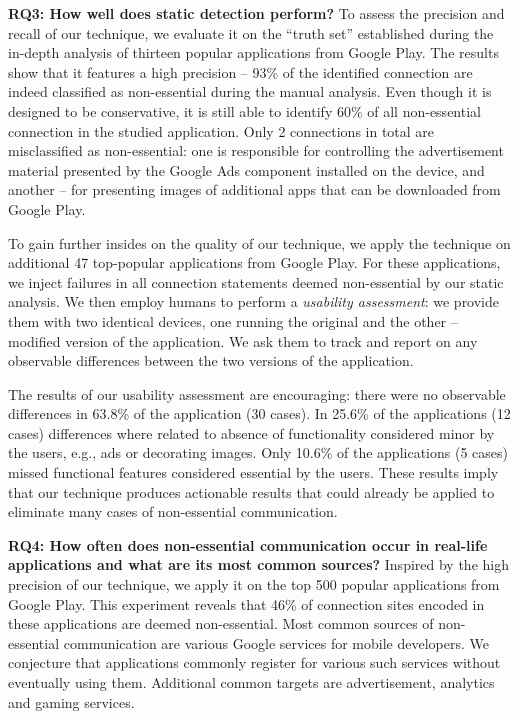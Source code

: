 \noindent 
{\bf RQ3: How well does static detection perform?}
To assess the precision and recall of our technique, we evaluate it on the ``truth set'' established during the in-depth analysis of thirteen popular applications from Google Play.
The results show that it features a high precision -- 93\% of the identified connection are indeed classified as non-essential during the manual analysis. Even though it is designed to be conservative, it is still able to identify  60\% of all non-essential connection in the studied application.
Only 2 connections in total are misclassified as non-essential: one is responsible for controlling the advertisement material presented by the Google Ads component installed on the device, and another -- for presenting images of additional apps that can be downloaded from Google Play. 

To gain further insides on the quality of our technique, we apply the technique on additional 47 top-popular applications from Google Play. For these applications, we inject failures in all connection statements deemed non-essential by our static analysis. We then employ humans to perform a \emph{usability assessment}: we provide them with two identical devices, one running the original and the other -- modified version of the application. We ask them to track and report on any observable differences between the two versions of the application. 

The results of our usability assessment are encouraging: there were no observable differences in 63.8\% of the application (30 cases). In 25.6\% of the applications (12 cases) differences where related to absence of functionality considered minor by the users, e.g., ads or decorating images. Only 10.6\% of the applications (5 cases) missed functional features considered essential by the users. 
These results imply that our technique produces actionable results that could already be applied to eliminate many cases of non-essential communication. 


\noindent 
{\bf RQ4: How often does non-essential communication occur in real-life applications and what are its most common sources?}
Inspired by the high precision of our technique, we apply it on the top 500 popular applications from Google Play. This experiment reveals that 46\% of connection sites encoded in these applications 
are deemed non-essential.
Most common sources of non-essential communication are various Google services for mobile developers. We conjecture 
that applications commonly register for various such services without eventually using them. 
Additional common targets are advertisement, analytics and gaming services. 


